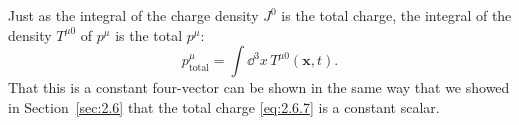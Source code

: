 Just as the integral of the charge density \(J^0\) is the total charge, the
integral of the density \(T^{\mu0}\) of \(p^\mu\) is the total \(p^\mu\):
\begin{equation}
  p^\mu_{\mathrm{total}}
  =\int \dd^3x\,T^{\mu0}(\mathbf x,t).
  \tag{2.8.14}\label{eq:2.8.14}
\end{equation}
That this is a constant four-vector can be shown in the same way that we showed
in Section~\ref{sec:2.6} that the total charge \eqref{eq:2.6.7} is a constant
scalar.

